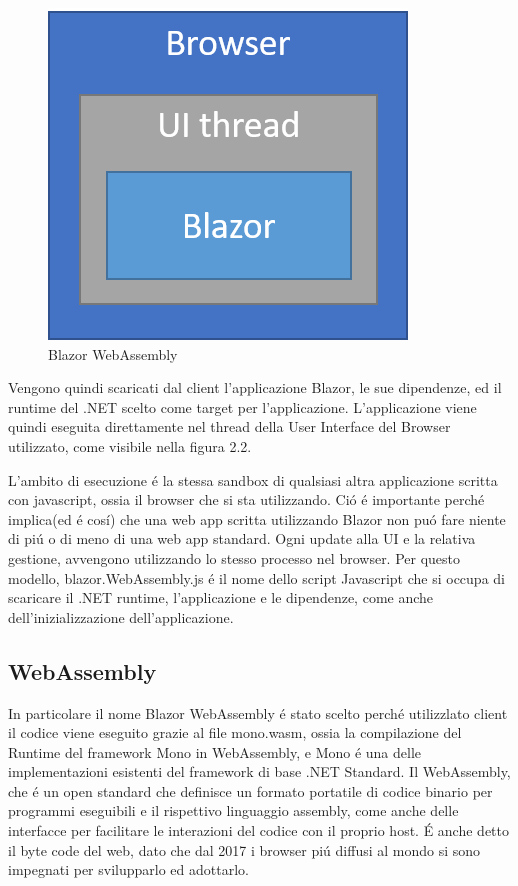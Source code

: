 \begin{figure}[H]
	\centerline{\includegraphics[scale=0.6]{figure/blazor-WebAssembly.png}}
	\caption{Blazor WebAssembly}
	\label{fig:BlazorWebAssembly}
\end{figure}

Vengono quindi scaricati dal client l'applicazione Blazor, le sue dipendenze, ed il runtime del .NET scelto come target per l'applicazione.
L'applicazione viene quindi eseguita direttamente nel thread della User Interface del Browser utilizzato, come visibile nella figura 2.2.

L'ambito di esecuzione \'e la stessa sandbox di qualsiasi altra applicazione scritta con javascript, ossia il browser che si sta utilizzando.
Ci\'o \'e importante perch\'e implica(ed \'e cos\'i) che una web app scritta utilizzando Blazor non pu\'o fare niente di pi\'u o di meno di una web app standard.
Ogni update alla UI e la relativa gestione, avvengono utilizzando lo stesso processo nel browser.
Per questo modello, blazor.WebAssembly.js \'e il nome dello script Javascript che si occupa di scaricare il .NET runtime, l'applicazione e le dipendenze, come anche dell'inizializzazione dell'applicazione.

\subsection{WebAssembly}\label{sez:webAssembly}
In particolare il nome Blazor WebAssembly \'e stato scelto perch\'e utilizzlato client il codice viene eseguito grazie al file mono.wasm, ossia la compilazione del Runtime del framework Mono in WebAssembly, e Mono \'e una delle implementazioni esistenti del framework di base .NET Standard.
Il WebAssembly, che \'e un open standard che definisce un formato portatile di codice binario per programmi eseguibili e il rispettivo linguaggio assembly, come anche delle interfacce per facilitare le interazioni del codice con il proprio host.
\'E anche detto il byte code del web, dato che dal 2017 i browser pi\'u diffusi al mondo si sono impegnati per svilupparlo ed adottarlo.\cite{webAssemblySupport}

